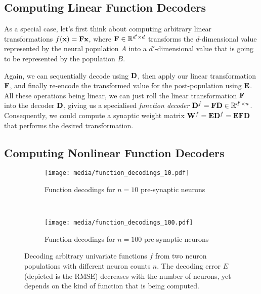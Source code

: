 \documentclass[10pt,letterpaper,oneside]{article}
\begin{document}
	\subsection{Computing Linear Function Decoders}

	As a special case, let's first think about computing arbitrary linear transformations $f({\mathbf{x}}) = {\mathbf{F}} {\mathbf{x}}$, where ${\mathbf{F}} \in \mathbb{R}^{d' \times d}$ transforms the $d$-dimensional value represented by the neural population $A$ into a $d'$-dimensional value that is going to be represented by the population $B$.

	Again, we can sequentially decode using ${\mathbf{D}}$, then apply our linear transformation ${\mathbf{F}}$, and finally re-encode the transformed value for the post-population using ${\mathbf{E}}$. All these operations being linear, we can just roll the linear transformation ${\mathbf{F}}$ into the decoder ${\mathbf{D}}$, giving us a specialised \emph{function decoder} ${\mathbf{D}}^{f} = {\mathbf{F}} {\mathbf{D}} \in \mathbb{R}^{d' \times n}$. Consequently, we could compute a synaptic weight matrix ${\mathbf{W}}^f = {\mathbf{E}} {\mathbf{D}}^f = {\mathbf{E}} {\mathbf{F}} {\mathbf{D}}$ that performs the desired transformation.

	\subsection{Computing Nonlinear Function Decoders}

	\begin{figure}
		\begin{subfigure}{\textwidth}
			\centering
			\texttt{[image: media/function\_decodings\_10.pdf]}
			\caption{Function decodings for $n = 10$ pre-synaptic neurons}
		\end{subfigure}\\[1cm]
		\begin{subfigure}{\textwidth}
			\centering
			\texttt{[image: media/function\_decodings\_100.pdf]}
			\caption{Function decodings for $n = 100$ pre-synaptic neurons}
		\end{subfigure}
		\caption{Decoding arbitrary univariate functions $f$ from two neuron populations with different neuron counts $n$. The decoding error $E$ (depicted is the RMSE) decreases with the number of neurons, yet depends on the kind of function that is being computed. }
		\label{fig:function_decodings}
	\end{figure}
\end{document}
